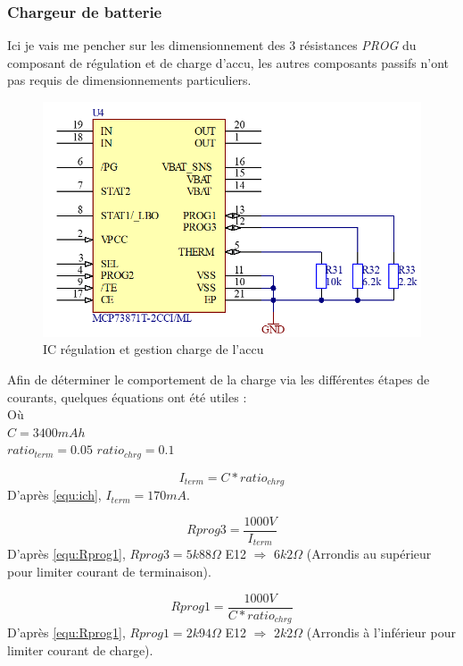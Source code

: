 {	\subsubsection{Chargeur de batterie} \label{sssec:BatCharger}
	{
		Ici je vais me pencher sur les dimensionnement des 3 résistances \textit{PROG} du composant de régulation et de charge d'accu, les autres composants passifs n'ont pas requis de dimensionnements particuliers.
		\begin{figure}[h]
			\centering
			\includegraphics[width=0.55\linewidth]{Figures/Dev-SCH/ChargeBat}
			\caption{IC régulation et gestion charge de l'accu}
			\label{fig:chargebat}
		\end{figure}
		
		Afin de déterminer le comportement de la charge via les différentes étapes de courants, quelques équations ont été utiles : \\
		Où \\
		$C = 3400mAh$ \\
		$ratio_{term} = 0.05$
		$ratio_{chrg} = 0.1$
		
		\begin{equation} \label{equ:ich}
			I_{term} = C * ratio_{chrg} 
		\end{equation}
		D'après \ref{equ:ich}, $I_{term} = 170mA$.
	 
	 	\begin{equation} \label{equ:Rprog3}
		 	Rprog3 = \frac{1000V}{I_{term}}
		\end{equation}
		D'après \ref{equ:Rprog1}, $Rprog3 = 5k88 \Omega$ E12 $\Longrightarrow$ $6k2\Omega$ (Arrondis au supérieur pour limiter courant de terminaison).
		
		\begin{equation} \label{equ:Rprog1}
			Rprog1 = \frac{1000V}{C * ratio_{chrg}} 
		\end{equation}
		D'après \ref{equ:Rprog1}, $Rprog1 = 2k94 \Omega$ E12 $\Longrightarrow$ $2k2\Omega$ (Arrondis à l'inférieur pour limiter courant de charge).
		 
	}
	
}
